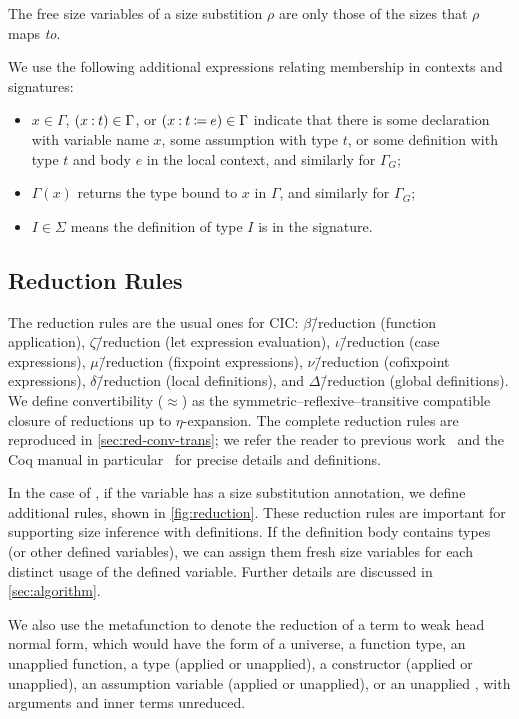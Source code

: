 The free size variables of a size substition $\rho$ are only those of the sizes that $\rho$ maps \emph{to}.

We use the following additional expressions relating membership in contexts and signatures:

\begin{itemize}
    \item $x \in \Gamma$, $(x \mathbin{:} t) \in \Gamma$, or $(x \mathbin{:} t \mathbin{\coloneqq} e) \in \Gamma$ indicate that there is some declaration with variable name $x$, some assumption with type $t$, or some definition with type $t$ and body $e$ in the local context, and similarly for $\Gamma_G$;
    \item $\Gamma(x)$ returns the type bound to $x$ in $\Gamma$, and similarly for $\Gamma_G$;
    \item $I \in \Sigma$ means the \coinductive definition of type $I$ is in the signature.
\end{itemize}

\subsection{Reduction Rules}

The reduction rules are the usual ones for CIC: $\beta$\=/reduction (function application), $\zeta$\=/reduction (let expression evaluation), $\iota$\=/reduction (case expressions), $\mu$\=/reduction (fixpoint expressions), $\nu$\=/reduction (cofixpoint expressions), $\delta$\=/reduction (local definitions), and $\Delta$\=/reduction (global definitions).
We define convertibility ($\approx$) as the symmetric--reflexive--transitive compatible closure of reductions up to $\eta$-expansion.
The complete reduction rules are reproduced in \autoref{sec:red-conv-trans};
we refer the reader to previous work~\citep{cic-hat-minus, cic-hat, cc-hat-omega} and the Coq manual in particular~\citet{coq} for precise details and definitions.



In the case of \deltaDeltareduction, if the variable has a size substitution annotation, we define additional rules, shown in \autoref{fig:reduction}.
These reduction rules are important for supporting size inference with definitions.
If the definition body contains \coinductive types (or other defined variables), we can assign them fresh size variables for each distinct usage of the defined variable.
Further details are discussed in \autoref{sec:algorithm}.

We also use the metafunction \whnf to denote the reduction of a term to weak head normal form, which would have the form of a universe, a function type, an unapplied function, a \coinductive type (applied or unapplied), a constructor (applied or unapplied), an assumption variable (applied or unapplied), or an unapplied \cofixpoint, with arguments and inner terms unreduced.

